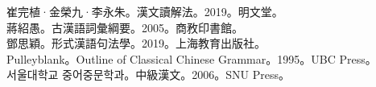 崔完植·金榮九·李永朱。漢文讀解法。2019。明文堂。\\
蔣紹愚。古漢語詞彙綱要。2005。商敄印書館。\\
鄧思穎。形式漢語句法學。2019。上海教育出版社。\\
Pulleyblank。Outline of Classical Chinese Grammar。1995。UBC Press。\\
서울대학교 중어중문학과。中級漢文。2006。SNU Press。\\
